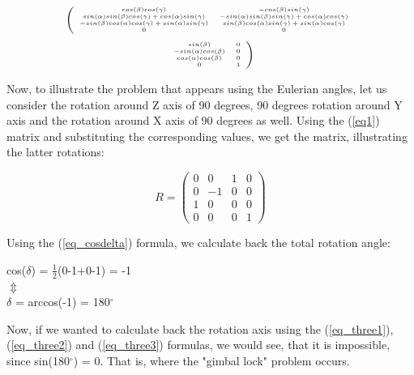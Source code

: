 \documentclass[times, 10pt,twocolumn]{article}
\begin{document}
\[ \left( \begin{tiny}\begin{array}{cccc}
cos(\beta)cos(\gamma) & -cos(\beta)sin(\gamma) \\
sin(\alpha)sin(\beta)cos(\gamma)+cos(\alpha)sin(\gamma) & -sin(\alpha)sin(\beta)sin(\gamma)+cos(\alpha)cos(\gamma) \\
-sin(\beta)cos(\alpha)cos(\gamma)+sin(\alpha)sin(\gamma) & sin(\beta)cos(\alpha)sin(\gamma)+sin(\alpha)cos(\gamma) \\
0 & 0
\end{array}\end{tiny} \right.
\]
\begin{equation}
\label{eq1}
\left. \begin{tiny}\begin{array}{cccc}
    sin(\beta) & 0 \\
    -sin(\alpha)cos(\beta) & 0 \\
    cos(\alpha)cos(\beta) & 0 \\
    0 & 1
    \end{array}\end{tiny} \right)
\end{equation}

Now, to illustrate the problem that appears using the Eulerian angles, let us consider the rotation around Z axis of 90 degrees, 90 degrees rotation around Y axis and the rotation around X axis of 90 degrees as well. Using the (\ref{eq1}) matrix and substituting the corresponding values, we get the matrix, illustrating the latter rotations:

\[ R = \left( \begin{array}{cccc}
0 & 0 & 1 & 0 \\
0 & -1 & 0 & 0 \\
1 & 0 & 0 & 0 \\
0 & 0 & 0 & 1
\end{array} \right)\]
  	
Using the (\ref{eq_cosdelta}) formula, we calculate back the total rotation angle:
\begin{center}
cos($\delta$) = $\frac{1}{2}$(0-1+0-1) = -1\\
$\Updownarrow$\\
$\delta$ = arccos(-1) = 180$^{\circ}$
\end{center}

Now, if we wanted to calculate back the rotation axis using the (\ref{eq_three1}), (\ref{eq_three2}) and (\ref{eq_three3}) formulas, we would see, that it is impossible, since sin(180$^{\circ}$) = 0. That is, where the "gimbal lock" problem occurs.
\end{document}
